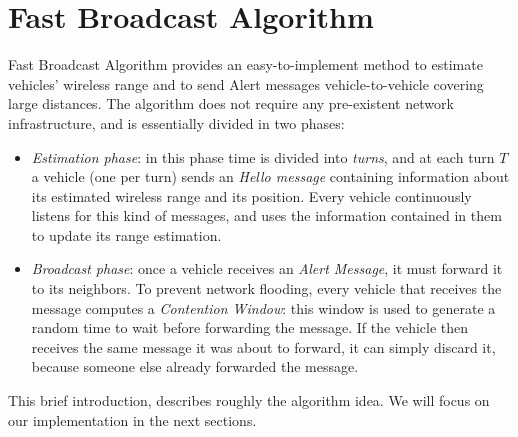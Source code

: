 \section{Fast Broadcast Algorithm}
\label{sec:fast_broadcast}
Fast Broadcast Algorithm provides an easy-to-implement method to estimate vehicles' wireless range and to send Alert messages vehicle-to-vehicle covering large distances. The algorithm does not require any pre-existent network infrastructure, and is essentially divided in two phases:
	\begin{itemize}
		\item \emph{Estimation phase}: in this phase time is divided into \textit{turns}, and at each turn $T$ a vehicle (one per turn) sends an \emph{Hello message} containing information about its estimated wireless range and its position. Every vehicle continuously listens for this kind of messages, and uses the information contained in them to update its range estimation.
		\item \emph{Broadcast phase}: 
		once a vehicle receives an \textit{Alert Message}, it must forward it to its neighbors. To prevent network flooding, every vehicle that receives the message computes a \textit{Contention Window}: this window is used to generate a random time to wait before forwarding the message. If the vehicle then receives the same message it was about to forward, it can simply discard it, because someone else already forwarded the message.
	\end{itemize} 
	
This brief introduction, describes roughly the algorithm idea. We will focus on our implementation in the next sections.
